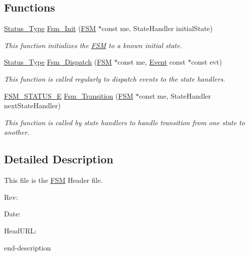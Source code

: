 \subsection*{Functions}
\begin{DoxyCompactItemize}
\item 
\hyperlink{group___f_s_m_ga3ef97600b5131dbf1b9a798e760e9268}{Status\_\-Type} \hyperlink{group___f_s_m_ga642a33b2ed914211fa65a9a802217532}{Fsm\_\-Init} (\hyperlink{struct_f_s_m}{FSM} $\ast$const me, StateHandler initialState)
\begin{DoxyCompactList}\small\item\em This function initializes the \hyperlink{struct_f_s_m}{FSM} to a known initial state. \end{DoxyCompactList}\item 
\hyperlink{group___f_s_m_ga3ef97600b5131dbf1b9a798e760e9268}{Status\_\-Type} \hyperlink{group___f_s_m_gaa985b514837a40bd2ab5bfb558c430e1}{Fsm\_\-Dispatch} (\hyperlink{struct_f_s_m}{FSM} $\ast$const me, \hyperlink{struct_event}{Event} const $\ast$const evt)
\begin{DoxyCompactList}\small\item\em This function is called regularly to dispatch events to the state handlers. \end{DoxyCompactList}\item 
\hyperlink{group___f_s_m_ga64d3de8a4121adac058d8a5e116d9b7d}{FSM\_\-STATUS\_\-E} \hyperlink{group___f_s_m_gac25b316d591ebf1763aeed9ab0eaae58}{Fsm\_\-Transition} (\hyperlink{struct_f_s_m}{FSM} $\ast$const me, StateHandler nextStateHandler)
\begin{DoxyCompactList}\small\item\em This function is called by state handlers to handle transition from one state to another. \end{DoxyCompactList}\end{DoxyCompactItemize}


\subsection{Detailed Description}
This file is the \hyperlink{struct_f_s_m}{FSM} Header file. \begin{DoxyParagraph}{Rev:}

\end{DoxyParagraph}
\begin{DoxyParagraph}{Date:}

\end{DoxyParagraph}
\begin{DoxyParagraph}{HeadURL:}

\end{DoxyParagraph}


end-\/description 
